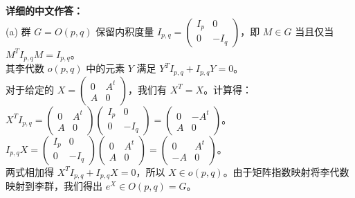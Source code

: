 \documentclass{ctexart}
\begin{document}
\vspace{1em}
\textbf{详细的中文作答：}\\
(a) 群 $G = O(p, q)$ 保留内积度量 $I_{p,q} = \begin{pmatrix} I_p & 0 \\ 0 & -I_q \end{pmatrix}$，即 $M \in G$ 当且仅当 $M^T I_{p,q} M = I_{p,q}$。\\
其李代数 $o(p, q)$ 中的元素 $Y$ 满足 $Y^T I_{p,q} + I_{p,q} Y = 0$。\\
对于给定的 $X = \begin{pmatrix} 0 & A^t \\ A & 0 \end{pmatrix}$，我们有 $X^T = X$。计算得：\\
$X^T I_{p,q} = \begin{pmatrix} 0 & A^t \\ A & 0 \end{pmatrix} \begin{pmatrix} I_p & 0 \\ 0 & -I_q \end{pmatrix} = \begin{pmatrix} 0 & -A^t \\ A & 0 \end{pmatrix}$。\\
$I_{p,q} X = \begin{pmatrix} I_p & 0 \\ 0 & -I_q \end{pmatrix} \begin{pmatrix} 0 & A^t \\ A & 0 \end{pmatrix} = \begin{pmatrix} 0 & A^t \\ -A & 0 \end{pmatrix}$。\\
两式相加得 $X^T I_{p,q} + I_{p,q} X = 0$，所以 $X \in o(p, q)$。由于矩阵指数映射将李代数映射到李群，我们得出 $e^X \in O(p, q) = G$。
\end{document}
